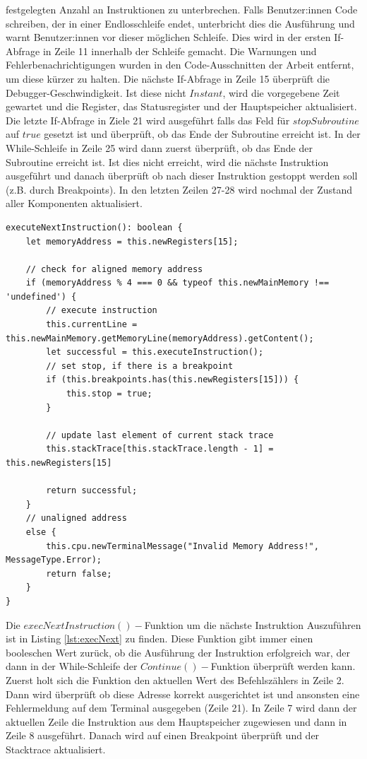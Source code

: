 \documentclass[a4paper, 11pt, onecolumn]{article}
\begin{document}
festgelegten Anzahl an Instruktionen zu unterbrechen. Falls Benutzer:innen Code schreiben, der in einer Endlosschleife endet, unterbricht dies die Ausführung und warnt Benutzer:innen vor dieser möglichen Schleife. Dies wird in der ersten If-Abfrage in Zeile 11 innerhalb der Schleife gemacht. Die Warnungen und Fehlerbenachrichtigungen wurden in den Code-Ausschnitten der Arbeit entfernt, um diese kürzer zu halten. Die nächste If-Abfrage in Zeile 15 überprüft die Debugger-Geschwindigkeit. Ist diese nicht $Instant$, wird die vorgegebene Zeit gewartet und die Register, das Statusregister und der Hauptspeicher aktualisiert. Die letzte If-Abfrage in Ziele 21 wird ausgeführt falls das Feld für $stopSubroutine$ auf $true$ gesetzt ist und überprüft, ob das Ende der Subroutine erreicht ist. In der While-Schleife in Zeile 25 wird dann zuerst überprüft, ob das Ende der Subroutine erreicht ist. Ist dies nicht erreicht, wird die nächste Instruktion ausgeführt und danach überprüft ob nach dieser Instruktion gestoppt werden soll (z.B. durch Breakpoints). In den letzten Zeilen 27-28 wird nochmal der Zustand aller Komponenten aktualisiert.

\begin{lstlisting}[style=JavaScript, basicstyle=\footnotesize, backgroundcolor=\color{backcolour}, caption={Funktion zum Ausführen der nächsten Instruktion}, captionpos=b, label={lst:execNext},float,floatplacement=H]
executeNextInstruction(): boolean {
    let memoryAddress = this.newRegisters[15];

    // check for aligned memory address
    if (memoryAddress % 4 === 0 && typeof this.newMainMemory !== 'undefined') {
        // execute instruction
        this.currentLine = this.newMainMemory.getMemoryLine(memoryAddress).getContent();
        let successful = this.executeInstruction();
        // set stop, if there is a breakpoint
        if (this.breakpoints.has(this.newRegisters[15])) {
            this.stop = true;
        }

        // update last element of current stack trace
        this.stackTrace[this.stackTrace.length - 1] = this.newRegisters[15]

        return successful;
    }
    // unaligned address
    else {
        this.cpu.newTerminalMessage("Invalid Memory Address!", MessageType.Error);
        return false;
    }
}   	
\end{lstlisting}

Die $execNextInstruction()-$Funktion um die nächste Instruktion Auszuführen ist in Listing \ref{lst:execNext} zu finden. Diese Funktion gibt immer einen booleschen Wert zurück, ob die Ausführung der Instruktion erfolgreich war, der dann in der While-Schleife der $Continue()-$Funktion überprüft werden kann. Zuerst holt sich die Funktion den aktuellen Wert des Befehlszählers in Zeile 2. Dann wird überprüft ob diese Adresse korrekt ausgerichtet ist und ansonsten eine Fehlermeldung auf dem Terminal ausgegeben (Zeile 21). In Zeile 7 wird dann der aktuellen Zeile die Instruktion aus dem Hauptspeicher zugewiesen und dann in Zeile 8 ausgeführt. Danach wird auf einen Breakpoint überprüft und der Stacktrace aktualisiert. \\
\end{document}
